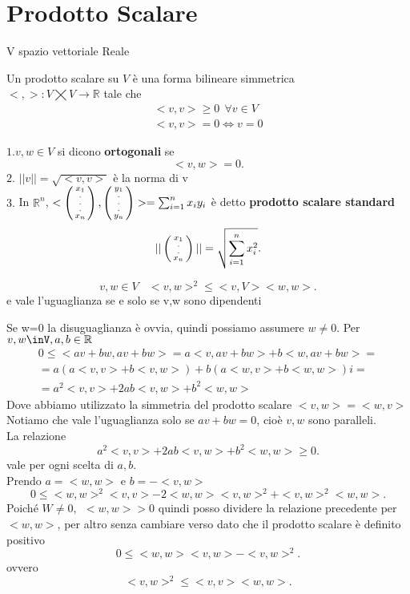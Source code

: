 \documentclass[12px]{article}
\begin{document}
\section{Prodotto Scalare}
V spazio vettoriale Reale
\begin{defi}
	Un prodotto scalare su $V$ è una forma bilineare simmetrica \\$< , >: V\bigtimes V \rightarrow \mathbb{R}$ tale che \\
	\begin{gather*}
		<v,v> \geq 0 \ \ \forall v\in V\\
		<v,v> = 0 \Leftrightarrow v=0
	\end{gather*}
\end{defi}
\begin{nome}
	$1. v,w\in V$ si dicono \textbf{ortogonali} se \[
	<v,w> = 0
	.\] 
	$2.$ $|| v || = \sqrt{<v,v>}$ è la norma di v\\
	$3.$ In $\mathbb{R}^n$, $<\left(\begin{smallmatrix}x_1\\.\\.\\.\\x_n\end{smallmatrix}\right),\left(\begin{smallmatrix}y_1\\.\\.\\.\\y_n\end{smallmatrix}\right)> = \sum^n_{i=1}x_iy_i$
	è detto \textbf{prodotto scalare standard}
	\[
		||\left(\begin{smallmatrix}x_1\\.\\.\\x_n\end{smallmatrix}\right)|| = \sqrt{\sum^n_{i=1}x_i^2}
	.\] 
\end{nome}
\begin{prop}
\[v,w\in V \ \ \ \ <v,w>^2 \leq <v,V><w,w>.\]
e vale l'uguaglianza se e solo se v,w sono dipendenti
\end{prop}
\newpage
\begin{dimo}
	Se w=0 la disuguaglianza è ovvia, quindi possiamo assumere $w\neq 0$. Per $v,w\inV, a,b\in\R$
	\begin{gather*}
	0\leq <av + bw, av + bw> = a<v,av + bw> + b<w,av + bw> =\\
	= a(a<v,v> + b<v,w>) + b(a<w,v> + b<w,w>)i =\\
	= a^2<v,v> + 2ab <v,w> + b^2 <w,w>
\end{gather*} 
Dove abbiamo utilizzato la simmetria del prodotto scalare $<v,w> = <w,v>$\\
Notiamo che vale l'uguaglianza solo se $av + bw = 0$, cioè $v,w$ sono paralleli.\\
La relazione
\[
a^2<v,v> + 2ab <v,w> + b^2 <w,w> \geq 0
.\] 
vale per ogni scelta di $a,b$. \\
Prendo $a = <w,w>$ e $b = -<v,w>$\\
\[
0\leq <w,w>^2<v,v>-2<w,w><v,w>^2 + <v,w>^2<w,w>
.\]
Poiché $W \neq 0, \ \ <w,w> > 0$ quindi posso dividere la relazione precedente per $< w,w>$, per altro senza cambiare verso dato che il prodotto scalare è definito positivo
\[
0\leq <w,w><v,w> - <v,w>^2
.\] 
ovvero \[
<v,w>^2 \leq <v,v><w,w>
.\] 
\end{dimo} \\
\end{document}
